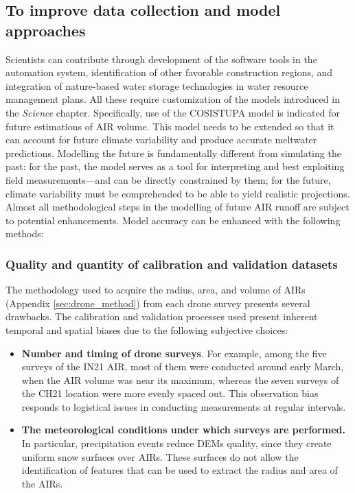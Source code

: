 \subsection{To improve data collection and model approaches}

Scientists can contribute through development of the software tools in the automation system, identification of
other favorable construction regions, and integration of nature-based water storage technologies in water
resource management plans. All these require customization of the models introduced in the
\textit{Science} chapter. Specifically, use of the COSISTUPA model is indicated for future estimations of \ac{AIR}
volume. This model needs to be extended so that it can account for future climate variability and produce
accurate meltwater predictions. Modelling the future is fundamentally different from simulating the past: for the
past, the model serves as a tool for interpreting and best exploiting field measurements---and can be directly
constrained by them; for the future, climate variability must be comprehended to be able to yield realistic
projections. Almost all methodological steps in the modelling of future \ac{AIR} runoff are subject to potential
enhancements. Model accuracy can be enhanced with the following methods:

\subsubsection{Quality and quantity of calibration and validation datasets}

The methodology used to acquire the radius, area, and volume of \ac{AIRs} (Appendix \ref{sec:drone_method}) from
each drone survey presents several drawbacks. The calibration and validation processes used present inherent temporal
and spatial biases due to the following subjective choices:

\begin{itemize}
	\item \textbf{Number and timing of drone surveys}. For example, among the five surveys of the IN21 \ac{AIR}, most of them were
	      conducted around early March, when the \ac{AIR} volume was near its maximum, whereas the seven surveys of the CH21
	      location were more evenly spaced out. This observation bias responds to logistical issues
	      in conducting measurements at regular intervals.

  \item \textbf{The meteorological conditions under which surveys are performed.} In particular, precipitation
    events reduce \ac{DEMs} quality, since they create uniform snow surfaces over \ac{AIRs}. These surfaces do
    not allow the identification of features that can be used to extract the radius and area of the \ac{AIRs}.

\end{itemize}

